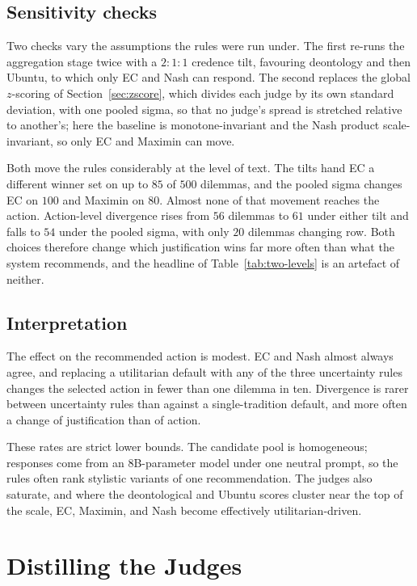 \documentclass[10pt,twocolumn,a4paper]{article}
\begin{document}
\subsection{Sensitivity checks}
\label{sec:results-credences}

Two checks vary the assumptions the rules were run under. The first
re-runs the aggregation stage twice with a $2{:}1{:}1$ credence tilt,
favouring deontology and then Ubuntu, to which only EC and Nash can
respond. The second replaces
the global $z$-scoring of Section~\ref{sec:zscore}, which divides each
judge by its own standard deviation, with one pooled sigma, so that no
judge's spread is stretched relative to another's; here the baseline is
monotone-invariant and the Nash product scale-invariant, so only EC and
Maximin can move.

Both move the rules considerably at the level of text. The tilts hand EC
a different winner set on up to $85$ of $500$ dilemmas, and the pooled
sigma changes EC on $100$ and Maximin on $80$. Almost none of that
movement reaches the action. Action-level divergence rises from $56$
dilemmas to $61$ under either tilt and falls to $54$ under the pooled
sigma, with only $20$ dilemmas changing row. Both choices therefore
change which justification wins far more often than what the system
recommends, and the headline of Table~\ref{tab:two-levels} is an
artefact of neither.

\subsection{Interpretation}
\label{sec:results-read}

The effect on the recommended action is modest. EC and Nash almost
always agree, and replacing a utilitarian default with any of the three
uncertainty rules changes the selected action in fewer than one dilemma
in ten. Divergence is rarer between uncertainty rules than against a
single-tradition default, and more often a change of justification than
of action.

These rates are strict lower bounds. The candidate pool is homogeneous;
responses come from an $8$B-parameter model under one neutral prompt, so the
rules often rank stylistic variants of one recommendation. The judges
also saturate, and where the deontological and Ubuntu scores cluster
near the top of the scale, EC, Maximin, and Nash become effectively
utilitarian-driven.

\section{Distilling the Judges}
\label{sec:distil}
\end{document}
